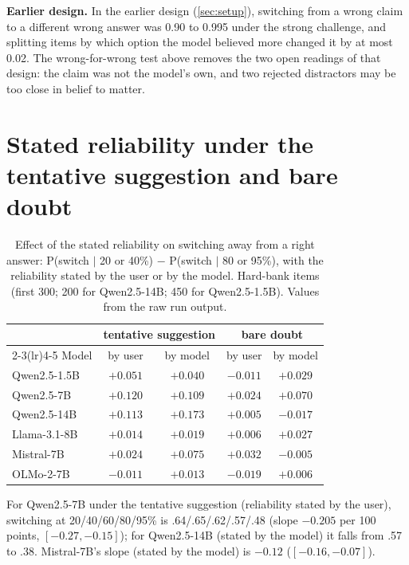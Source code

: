 \documentclass{article} %
\begin{document}
\textbf{Earlier design.} In the earlier design (\cref{sec:setup}), switching from a wrong claim to a different wrong answer was 0.90 to 0.995 under the strong challenge, and splitting items by which option the model believed more changed it by at most 0.02. The wrong-for-wrong test above removes the two open readings of that design: the claim was not the model's own, and two rejected distractors may be too close in belief to matter.

\section{Stated reliability under the tentative suggestion and bare doubt}
\label{app:tentative}

\begin{table}[h]
\caption{Effect of the stated reliability on switching away from a right answer: P(switch $\mid$ 20 or 40\%) $-$ P(switch $\mid$ 80 or 95\%), with the reliability stated by the user or by the model. Hard-bank items (first 300; 200 for Qwen2.5-14B; 450 for Qwen2.5-1.5B). Values from the raw run output.}
\label{tab:tentative}
\centering\small
\begin{tabular}{lcccc}
\toprule
 & \multicolumn{2}{c}{tentative suggestion} & \multicolumn{2}{c}{bare doubt} \\
\cmidrule(lr){2-3}\cmidrule(lr){4-5}
Model & by user & by model & by user & by model \\
\midrule
Qwen2.5-1.5B & $+0.051$ & $+0.040$ & $-0.011$ & $+0.029$ \\
Qwen2.5-7B & $+0.120$ & $+0.109$ & $+0.024$ & $+0.070$ \\
Qwen2.5-14B & $+0.113$ & $+0.173$ & $+0.005$ & $-0.017$ \\
Llama-3.1-8B & $+0.014$ & $+0.019$ & $+0.006$ & $+0.027$ \\
Mistral-7B & $+0.024$ & $+0.075$ & $+0.032$ & $-0.005$ \\
OLMo-2-7B & $-0.011$ & $+0.013$ & $-0.019$ & $+0.006$ \\
\bottomrule
\end{tabular}
\end{table}

For Qwen2.5-7B under the tentative suggestion (reliability stated by the user), switching at 20/40/60/80/95\% is .64/.65/.62/.57/.48 (slope $-0.205$ per 100 points, $[-0.27, -0.15]$); for Qwen2.5-14B (stated by the model) it falls from .57 to .38. Mistral-7B's slope (stated by the model) is $-0.12$ ($[-0.16, -0.07]$).
\end{document}
